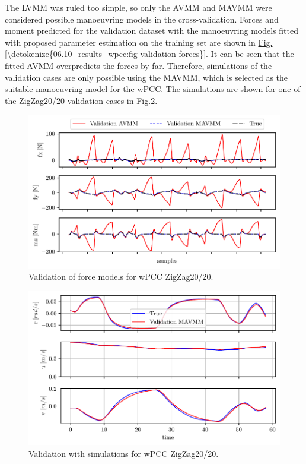 The LVMM was ruled too simple, so only the AVMM and MAVMM were considered possible manoeuvring models in the cross-validation.
Forces and moment predicted for the validation dataset with the manoeuvring models fitted with proposed parameter estimation on the training set are shown in \hyperref[\detokenize{06.10_results_wpcc:fig-validation-forces}]{Fig.\@ \ref{\detokenize{06.10_results_wpcc:fig-validation-forces}}}. It can be seen that the fitted AVMM overpredicts the forces by far. Therefore, simulations of the validation cases are only possible using the MAVMM, which is selected as the suitable manoeuvring model for the wPCC.
The simulations are shown for one of the ZigZag20/20 validation cases in \hyperref[\detokenize{06.10_results_wpcc:fig-validation-sim}]{Fig.\@ \ref{\detokenize{06.10_results_wpcc:fig-validation-sim}}}.

\begin{figure}[!htb]
\centering
\includegraphics{kappa/images/7.pdf}
\caption{Validation of force models for wPCC ZigZag20/20.}\label{fig:validation-forces}
\end{figure}

\begin{figure}[!htb]
\centering
\includegraphics{kappa/images/8.pdf}
\caption{Validation with simulations for wPCC ZigZag20/20.}\label{\detokenize{06.10_results_wpcc:fig-validation-sim}}\end{figure}


